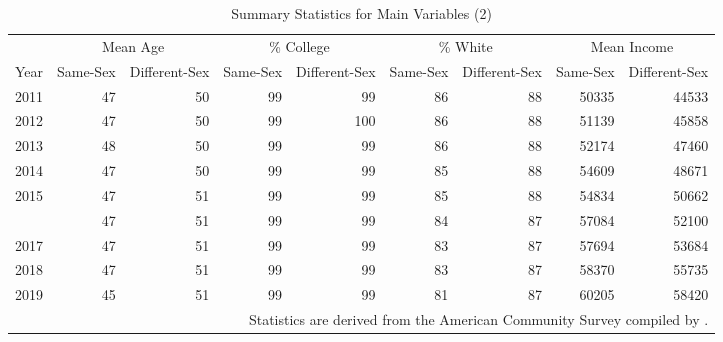 \begin{table}[htbp]

\caption{Summary Statistics for Main Variables (2)}
\label{var_table_2} %
\centering
\begin{tabular}[t]{rrrrrrrrr}
\toprule
\multicolumn{1}{c}{ } & \multicolumn{2}{c}{Mean Age} & \multicolumn{2}{c}{\% College} & \multicolumn{2}{c}{\% White} & \multicolumn{2}{c}{Mean Income} \\
\cmidrule(l{3pt}r{3pt}){2-3} \cmidrule(l{3pt}r{3pt}){4-5} \cmidrule(l{3pt}r{3pt}){6-7} \cmidrule(l{3pt}r{3pt}){8-9}
Year & Same-Sex & Different-Sex & Same-Sex & Different-Sex & Same-Sex & Different-Sex & Same-Sex & Different-Sex\\
\midrule
2011 & 47 & 50 & 99 & 99 & 86 & 88 & 50335 & 44533\\
2012 & 47 & 50 & 99 & 100 & 86 & 88 & 51139 & 45858\\
2013 & 48 & 50 & 99 & 99 & 86 & 88 & 52174 & 47460\\
2014 & 47 & 50 & 99 & 99 & 85 & 88 & 54609 & 48671\\
2015 & 47 & 51 & 99 & 99 & 85 & 88 & 54834 & 50662\\
\addlinespace
2016 & 47 & 51 & 99 & 99 & 84 & 87 & 57084 & 52100\\
2017 & 47 & 51 & 99 & 99 & 83 & 87 & 57694 & 53684\\
2018 & 47 & 51 & 99 & 99 & 83 & 87 & 58370 & 55735\\
2019 & 45 & 51 & 99 & 99 & 81 & 87 & 60205 & 58420\\
\bottomrule
\multicolumn{9}{p{0.8\linewidth}}{\footnotesize Statistics are derived from the American Community Survey compiled by \citet{28}.} \\
\end{tabular}
\end{table}
